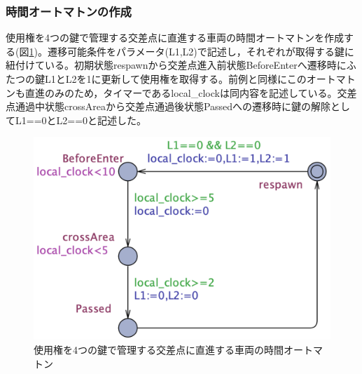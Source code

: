 \documentclass{tpu-sotu}
\begin{document}
	\subsubsection{時間オートマトンの作成}
	使用権を4つの鍵で管理する交差点に直進する車両の時間オートマトンを作成する(図\ref{news})。遷移可能条件をパラメータ(L1,L2)で記述し，それぞれが取得する鍵に紐付けている。初期状態respawnから交差点進入前状態BeforeEnterへ遷移時にふたつの鍵L1とL2を1に更新して使用権を取得する。前例と同様にこのオートマトンも直進のみのため，タイマーであるlocal\_clockは同内容を記述している。交差点通過中状態crossAreaから交差点通過後状態Passedへの遷移時に鍵の解除としてL1==0とL2==0と記述した。
	\begin{figure}[htbp]
	\centering
	\includegraphics[width=130mm]{news.png}
	\caption{使用権を4つの鍵で管理する交差点に直進する車両の時間オートマトン}
	\label{news}
	\end{figure}
\end{document}
